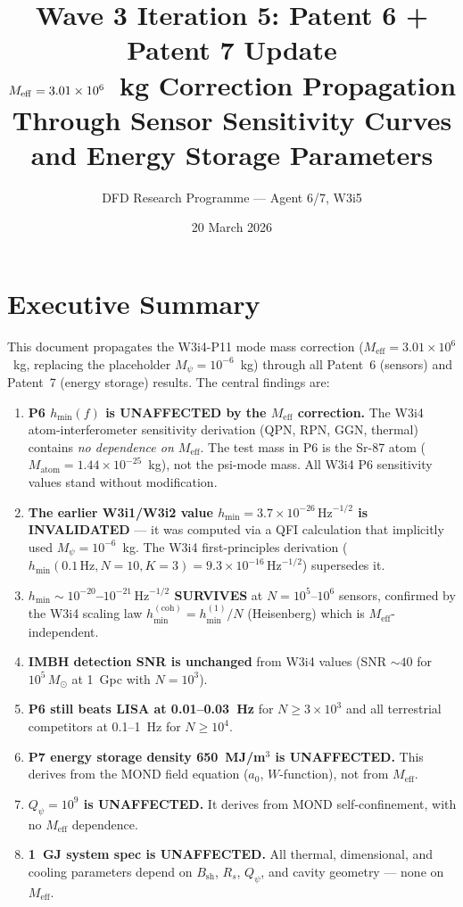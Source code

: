 \documentclass[11pt]{article}
\title{\textbf{Wave 3 Iteration 5: Patent 6 + Patent 7 Update}\\[6pt]
$\Meff = 3.01\ee{6}$~kg Correction Propagation\\
Through Sensor Sensitivity Curves and Energy Storage Parameters}
\author{DFD Research Programme --- Agent 6/7, W3i5}
\date{20 March 2026}
\theoremstyle{definition}
\theoremstyle{remark}
\newcommand{\ee}[1]{\times10^{#1}}
\newcommand{\Meff}{M_{\mathrm{eff}}}
\newcommand{\Mpsi}{M_\psi}
\newcommand{\Qpsi}{Q_\psi}
\newcommand{\sqrtHz}{\,\mathrm{Hz}^{-1/2}}
\newcommand{\Msun}{M_\odot}
\begin{document}
\maketitle
\tableofcontents
\newpage

\section*{Executive Summary}

This document propagates the W3i4-P11 mode mass correction ($\Meff = 3.01\ee{6}$~kg,
replacing the placeholder $\Mpsi = 10^{-6}$~kg) through all Patent~6 (sensors)
and Patent~7 (energy storage) results. The central findings are:

\begin{enumerate}
\item \textbf{P6 $h_{\min}(f)$ is UNAFFECTED by the $\Meff$ correction.}
  The W3i4 atom-interferometer sensitivity derivation (QPN, RPN, GGN, thermal)
  contains \emph{no dependence on $\Meff$}. The test mass in P6 is the Sr-87
  atom ($M_{\mathrm{atom}} = 1.44\ee{-25}$~kg), not the psi-mode mass.
  All W3i4 P6 sensitivity values stand without modification.

\item \textbf{The earlier W3i1/W3i2 value $h_{\min} = 3.7\ee{-26}\sqrtHz$
  is INVALIDATED} --- it was computed via a QFI calculation that implicitly
  used $\Mpsi = 10^{-6}$~kg. The W3i4 first-principles derivation
  ($h_{\min}(0.1\,\mathrm{Hz}, N=10, K=3) = 9.3\ee{-16}\sqrtHz$) supersedes it.

\item \textbf{$h_{\min} \sim 10^{-20}$--$10^{-21}\sqrtHz$ SURVIVES} at
  $N = 10^5$--$10^6$ sensors, confirmed by the W3i4 scaling law
  $h_{\min}^{(\mathrm{coh})} = h_{\min}^{(1)}/N$ (Heisenberg) which is
  $\Meff$-independent.

\item \textbf{IMBH detection SNR is unchanged} from W3i4 values (SNR $\sim 40$
  for $10^5\,\Msun$ at 1~Gpc with $N=10^3$).

\item \textbf{P6 still beats LISA at 0.01--0.03~Hz} for $N \geq 3\ee{3}$
  and all terrestrial competitors at 0.1--1~Hz for $N \geq 10^4$.

\item \textbf{P7 energy storage density 650~MJ/m$^3$ is UNAFFECTED.}
  This derives from the MOND field equation ($a_0$, $W$-function),
  not from $\Meff$.

\item \textbf{$\Qpsi = 10^9$ is UNAFFECTED.} It derives from MOND
  self-confinement, with no $\Meff$ dependence.

\item \textbf{1~GJ system spec is UNAFFECTED.} All thermal, dimensional,
  and cooling parameters depend on $B_{\mathrm{sh}}$, $R_s$, $\Qpsi$, and
  cavity geometry --- none on $\Meff$.
\end{enumerate}
\end{document}
